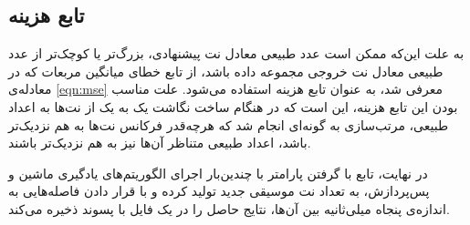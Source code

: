 
\subsection{تابع هزینه}
به علت این‌که ممکن است عدد طبیعی معادل نت پیشنهادی، بزرگ‌تر یا کوچک‌تر از عدد طبیعی معادل نت خروجی مجموعه داده باشد، از تابع خطای میانگین مربعات که در معادله‌ی
\ref{eqn:mse}
معرفی شد، به عنوان تابع هزینه استفاده می‌شود.
علت مناسب بودن این تابع هزینه، این است که در هنگام ساخت نگاشت یک به یک از نت‌ها به اعداد طبیعی، مرتب‌سازی به گونه‌ای انجام شد که هرچه‌قدر فرکانس نت‌ها به هم نزدیک‌تر باشد، اعداد طبیعی متناظر آن‌ها نیز به هم نزدیک‌تر باشند.

در نهایت، تابع
با گرفتن پارامتر
با چندین‌بار اجرای الگوریتم‌های یادگیری ماشین و پس‌پردازش، به تعداد
نت موسیقی جدید تولید کرده و با قرار دادن فاصله‌هایی به اندازه‌ی پنجاه میلی‌ثانیه بین آن‌ها، نتایج حاصل را در یک فایل با پسوند
ذخیره می‌کند.

